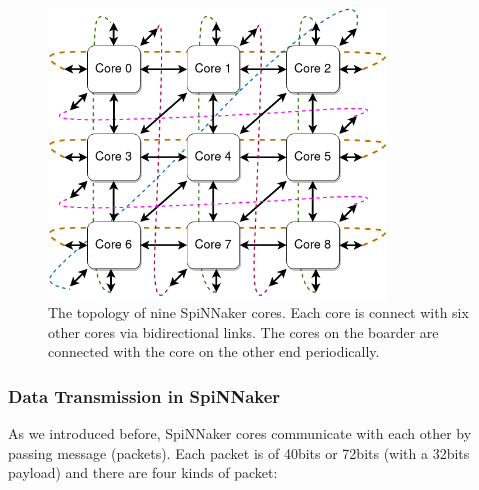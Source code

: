 \begin{figure}[!tb]
   \centering
       \includegraphics[width=0.8\textwidth]{figures/topology.png}
       \caption{The topology of nine SpiNNaker cores. Each core is connect with six other cores via bidirectional links. The cores on the boarder are connected with the core on the other end periodically.}
       \label{fig:topology}
\end{figure}

\subsubsection{Data Transmission in SpiNNaker} \label{sec:dt}
As we introduced before, SpiNNaker cores communicate with each other by passing message (packets). Each packet is of 40bits or 72bits (with a 32bits payload) \cite{furber2012overview} and there are four kinds\cite{ws6} of packet:

